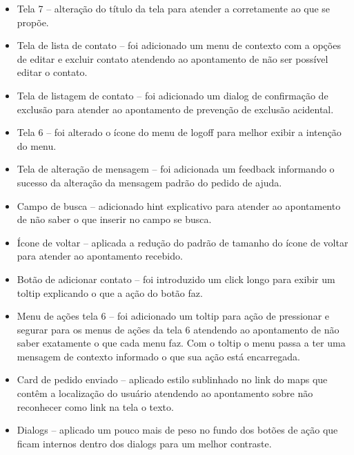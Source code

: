 \begin{itemize}
	\item Tela 7 – alteração do título da tela para atender a corretamente ao que se propõe.
	\item Tela de lista de contato – foi adicionado um menu de contexto com a opções de editar e excluir contato atendendo ao apontamento de não ser possível editar o contato.
	\item Tela de listagem de contato – foi adicionado um dialog de confirmação de exclusão para atender ao apontamento de prevenção de exclusão acidental.
	\item Tela 6 – foi alterado o ícone do menu de logoff para melhor exibir a intenção do menu.
	\item Tela de alteração de mensagem – foi adicionada um feedback informando o sucesso da alteração da mensagem padrão do pedido de ajuda.
	\item Campo de busca – adicionado hint explicativo para atender ao apontamento de não saber o que inserir no campo se busca.
	\item Ícone de voltar – aplicada a redução do padrão de tamanho do ícone de voltar para atender ao apontamento recebido.
	\item Botão de adicionar contato – foi introduzido um click longo para exibir um toltip explicando o que a ação do botão faz.
	\item Menu de ações tela 6 – foi adicionado um toltip para ação de pressionar e segurar para os menus de ações da tela 6 atendendo ao apontamento de não saber exatamente o que cada menu faz. Com o toltip o menu passa a ter uma mensagem de contexto informado o que sua ação está encarregada.
	\item Card de pedido enviado – aplicado estilo sublinhado no link do maps que contêm a localização do usuário atendendo ao apontamento sobre não reconhecer como link na tela o texto.
	\item Dialogs – aplicado um pouco mais de peso no fundo dos botões de ação que ficam internos dentro dos dialogs para um melhor contraste.
	
\end{itemize}

